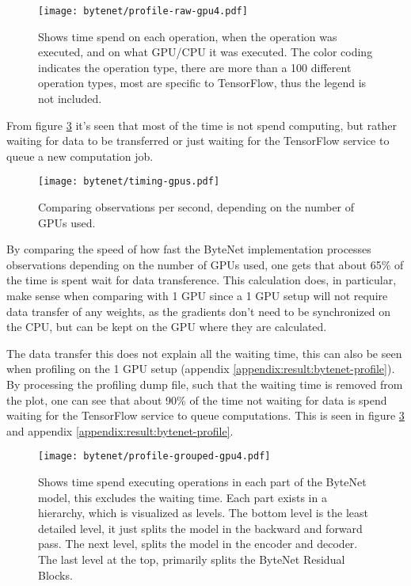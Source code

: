 \begin{figure}[h]
    \centering
    \texttt{[image: bytenet/profile-raw-gpu4.pdf]}
    \caption{Shows time spend on each operation, when the operation was executed, and on what GPU/CPU it was executed. The color coding indicates the operation type, there are more than a 100 different operation types, most are specific to TensorFlow, thus the legend is not included.}
    \label{fig:result:bytenet:profile-raw}
\end{figure}

From figure \ref{fig:result:bytenet:profile-raw} it's seen that most of the time is not spend computing, but rather waiting for data to be transferred or just waiting for the TensorFlow service to queue a new computation job.

\begin{figure}[h]
    \centering
    \texttt{[image: bytenet/timing-gpus.pdf]}
    \caption{Comparing observations per second, depending on the number of GPUs used.}
    \label{fig:result:bytenet:timing-gpus}
\end{figure}

By comparing the speed of how fast the ByteNet implementation processes observations depending on the number of GPUs used, one gets that about 65\% of the time is spent wait for data transference. This calculation does, in particular, make sense when comparing with 1 GPU since a 1 GPU setup will not require data transfer of any weights, as the gradients don't need to be synchronized on the CPU, but can be kept on the GPU where they are calculated.

The data transfer this does not explain all the waiting time, this can also be seen when profiling on the 1 GPU setup (appendix \ref{appendix:result:bytenet-profile}). By processing the profiling dump file, such that the waiting time is removed from the plot, one can see that about 90\% of the time not waiting for data is spend waiting for the TensorFlow service to queue computations. This is seen in figure \ref{fig:result:bytenet:profile-raw} and appendix \ref{appendix:result:bytenet-profile}.

\begin{figure}[h]
    \centering
    \texttt{[image: bytenet/profile-grouped-gpu4.pdf]}
    \caption{Shows time spend executing operations in each part of the ByteNet model, this excludes the waiting time. Each part exists in a hierarchy, which is visualized as levels. The bottom level is the least detailed level, it just splits the model in the backward and forward pass. The next level, splits the model in the encoder and decoder. The last level at the top, primarily splits the ByteNet Residual Blocks.}
    \label{fig:result:bytenet:profile-raw}
\end{figure}

